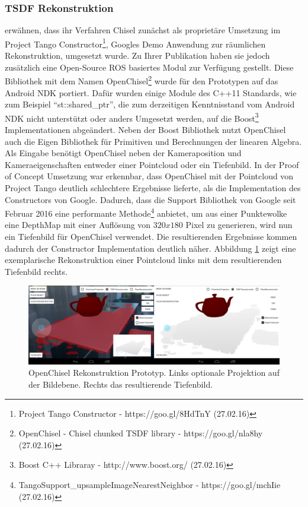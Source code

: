 \subsubsection*{TSDF Rekonstruktion}

\citet{Klingensmith_2015_7924} erwähnen, dass ihr Verfahren Chisel zunächst als proprietäre Umsetzung im Project Tango Constructor\footnote{Project Tango Constructor - https://goo.gl/8HdTnY (27.02.16)}, Googles Demo Anwendung zur räumlichen Rekonstruktion, umgesetzt wurde. Zu Ihrer Publikation haben sie jedoch zusätzlich eine Open-Source ROS basiertes Modul zur Verfügung gestellt. Diese Bibliothek mit dem Namen OpenChisel\footnote{OpenChisel - Chisel chunked TSDF library - https://goo.gl/nla8hy (27.02.16)} wurde für den Prototypen auf das Android NDK portiert. Dafür wurden einige Module des C++11 Standards, wie zum Beispiel \enquote{st::shared\_ptr}, die zum derzeitigen Kenntnisstand vom Android NDK nicht unterstützt oder anders Umgesetzt werden, auf die Boost\footnote{Boost C++ Libraray - http://www.boost.org/ (27.02.16)} Implementationen abgeändert. Neben der Boost Bibliothek nutzt OpenChisel auch die Eigen Bibliothek für Primitiven und Berechnungen der linearen Algebra.\\

Als Eingabe benötigt OpenChisel neben der Kameraposition und Kameraeigenschaften entweder einer Pointcloud oder ein Tiefenbild. In der Proof of Concept Umsetzung war erkennbar, dass OpenChisel mit der Pointcloud von Project Tango deutlich schlechtere Ergebnisse lieferte, als die Implementation des Constructors von Google. Dadurch, dass die Support Bibliothek von Google seit Februar 2016 eine performante Methode\footnote{TangoSupport\_upsampleImageNearestNeighbor - https://goo.gl/mchIie (27.02.16)} anbietet, um aus einer Punktewolke eine DepthMap mit einer Auflösung von \(320x180\) Pixel zu generieren, wird nun ein Tiefenbild für OpenChisel verwendet. Die resultierenden Ergebnisse kommen dadurch der Constructor Implementation deutlich näher. Abbildung \ref{fig:chisel-demo} zeigt eine exemplarische Rekonstruktion einer Pointcloud links mit dem resultierenden Tiefenbild rechts.

\begin{figure}[h]
  \centering
	\includegraphics[width=1.0\textwidth]{content/images/implementation/chisel-demo.png} 
  \caption{OpenChisel Rekonstruktion Prototyp. Links optionale Projektion auf der Bildebene. Rechts das resultierende Tiefenbild.}
  \label{fig:chisel-demo}
\end{figure}
